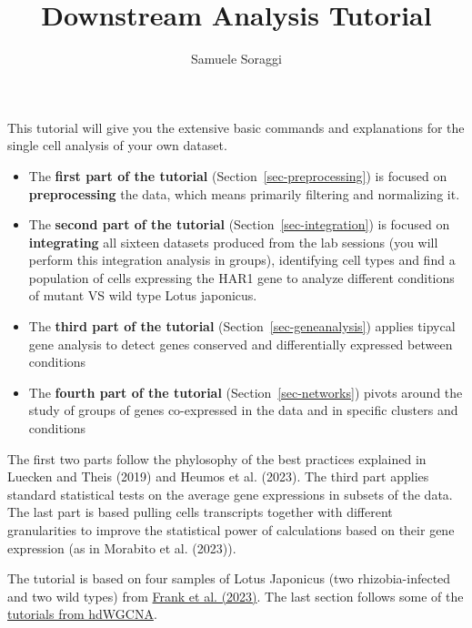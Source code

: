 \documentclass[
  letterpaper,
  DIV=11,
  numbers=noendperiod]{scrartcl}
\title{Downstream Analysis Tutorial}
\author{Samuele Soraggi}
\date{}
\renewcommand*\contentsname{Table of contents}
\newcommand\contentsname{Table of contents}
\begin{document}
\maketitle

\renewcommand*\contentsname{Table of contents}
{
\hypersetup{linkcolor=}
\setcounter{tocdepth}{3}
\tableofcontents
}
This tutorial will give you the extensive basic commands and
explanations for the single cell analysis of your own dataset.

\begin{itemize}
\item
  The \textbf{first part of the tutorial}
  (Section~\ref{sec-preprocessing}) is focused on \textbf{preprocessing}
  the data, which means primarily filtering and normalizing it.
\item
  The \textbf{second part of the tutorial}
  (Section~\ref{sec-integration}) is focused on \textbf{integrating} all
  sixteen datasets produced from the lab sessions (you will perform this
  integration analysis in groups), identifying cell types and find a
  population of cells expressing the HAR1 gene to analyze different
  conditions of mutant VS wild type Lotus japonicus.
\item
  The \textbf{third part of the tutorial}
  (Section~\ref{sec-geneanalysis}) applies tipycal gene analysis to
  detect genes conserved and differentially expressed between conditions
\item
  The \textbf{fourth part of the tutorial} (Section~\ref{sec-networks})
  pivots around the study of groups of genes co-expressed in the data
  and in specific clusters and conditions
\end{itemize}

The first two parts follow the phylosophy of the best practices
explained in Luecken and Theis (2019) and Heumos et al. (2023). The
third part applies standard statistical tests on the average gene
expressions in subsets of the data. The last part is based pulling cells
transcripts together with different granularities to improve the
statistical power of calculations based on their gene expression (as in
Morabito et al. (2023)).

The tutorial is based on four samples of Lotus Japonicus (two
rhizobia-infected and two wild types) from
\href{https://www.ncbi.nlm.nih.gov/pmc/articles/PMC10630511/pdf/41467_2023_Article_42911.pdf}{Frank
et al. (2023)}. The last section follows some of the
\href{https://smorabit.github.io/hdWGCNA/}{tutorials from hdWGCNA}.
\end{document}
